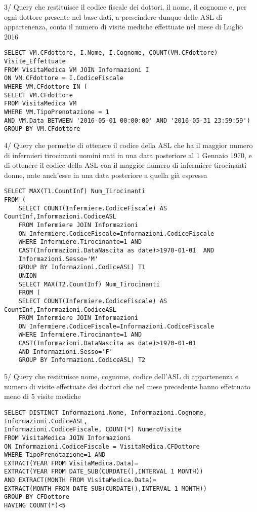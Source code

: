 \documentclass{report}
\begin{document}
3/ Query che restituisce il codice fiscale dei dottori, il nome, il cognome e, per ogni dottore presente nel base dati, a prescindere dunque delle ASL di appartenenza, conta il numero di visite mediche effettuate nel mese di Luglio 2016 

\begin{verbatim}
SELECT VM.CFdottore, I.Nome, I.Cognome, COUNT(VM.CFdottore) Visite_Effettuate 
FROM VisitaMedica VM JOIN Informazioni I 
ON VM.CFdottore = I.CodiceFiscale 
WHERE VM.CFdottore IN (
SELECT VM.CFdottore 
FROM VisitaMedica VM 
WHERE VM.TipoPrenotazione = 1 
AND VM.Data BETWEEN '2016-05-01 00:00:00' AND '2016-05-31 23:59:59') 
GROUP BY VM.CFdottore
\end{verbatim}

4/ Query che permette di ottenere il codice della ASL che ha il maggior numero di infermieri tirocinanti uomini nati in una data posteriore al 1 Gennaio 1970, e di ottenere il codice della ASL con il maggior numero di infermiere tirocinanti donne, nate anch’esse in una data posteriore a quella già espressa
 \begin{verbatim}
SELECT MAX(T1.CountInf) Num_Tirocinanti  
FROM (
	SELECT COUNT(Infermiere.CodiceFiscale) AS CountInf,Informazioni.CodiceASL 
	FROM Infermiere JOIN Informazioni 
	ON Infermiere.CodiceFiscale=Informazioni.CodiceFiscale 
	WHERE Infermiere.Tirocinante=1 AND 
	CAST(Informazioni.DataNascita as date)>1970-01-01  AND 
	Informazioni.Sesso='M' 
	GROUP BY Informazioni.CodiceASL) T1 
	UNION 
	SELECT MAX(T2.CountInf) Num_Tirocinanti 
	FROM (
	SELECT COUNT(Infermiere.CodiceFiscale) AS CountInf,Informazioni.CodiceASL 
	FROM Infermiere JOIN Informazioni 
	ON Infermiere.CodiceFiscale=Informazioni.CodiceFiscale 
	WHERE Infermiere.Tirocinante=1 AND 
	CAST(Informazioni.DataNascita as date)>1970-01-01 
	AND Informazioni.Sesso='F' 
	GROUP BY Informazioni.CodiceASL) T2
\end{verbatim}

5/ Query che restituisce nome, cognome, codice dell’ASL di appartenenza e numero di visite effettuate dei dottori che nel mese precedente hanno effettuato meno di 5 visite mediche
\begin{verbatim}
SELECT DISTINCT Informazioni.Nome, Informazioni.Cognome, Informazioni.CodiceASL,
Informazioni.CodiceFiscale, COUNT(*) NumeroVisite 
FROM VisitaMedica JOIN Informazioni 
ON Informazioni.CodiceFiscale = VisitaMedica.CFDottore 
WHERE TipoPrenotazione=1 AND 
EXTRACT(YEAR FROM VisitaMedica.Data)=
EXTRACT(YEAR FROM DATE_SUB(CURDATE(),INTERVAL 1 MONTH)) 
AND EXTRACT(MONTH FROM VisitaMedica.Data)=
EXTRACT(MONTH FROM DATE_SUB(CURDATE(),INTERVAL 1 MONTH)) 
GROUP BY CFDottore 
HAVING COUNT(*)<5
\end{verbatim}
\end{document}
